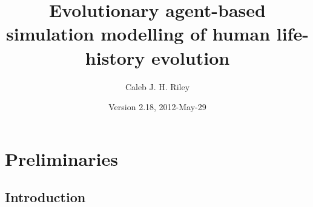 \documentclass[authoryearcitations]{UoYCSproject}
\author{Caleb J. H. Riley}
\title{Evolutionary agent-based simulation modelling of human life-history evolution}
\date{Version 2.18, 2012-May-29}
\begin{document}
\maketitle
\listoffigures
\listoftables
\renewcommand*{\lstlistlistingname}{List of Listings}
\lstlistoflistings

\cleardoublepage
\part{Preliminaries}
\label{sec:start}
\thispagestyle{empty}\cleardoublepage

\chapter{Introduction}
\label{cha:Introduction}
\end{document}
